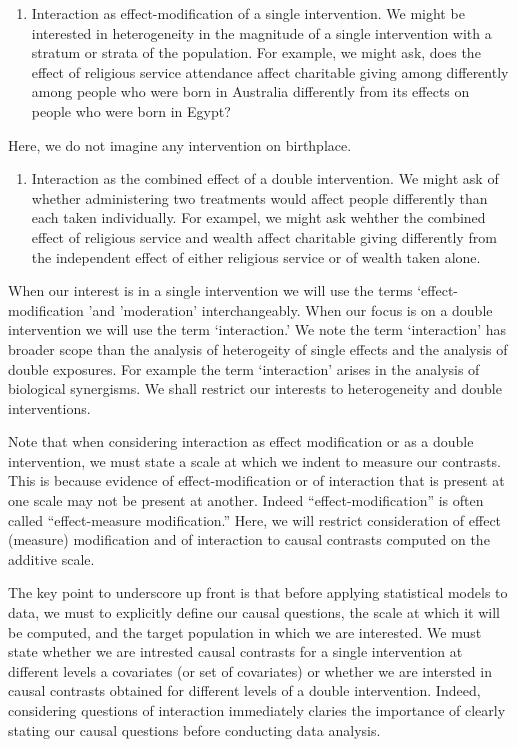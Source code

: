 \documentclass[
  single column]{article}
\providecommand{\tightlist}{%
  \setlength{\itemsep}{0pt}\setlength{\parskip}{0pt}}\usepackage{longtable,booktabs,array}
\begin{document}
\begin{enumerate}
\def\labelenumi{(\arabic{enumi})}
\tightlist
\item
  Interaction as effect-modification of a single intervention. We might
  be interested in heterogeneity in the magnitude of a single
  intervention with a stratum or strata of the population. For example,
  we might ask, does the effect of religious service attendance affect
  charitable giving among differently among people who were born in
  Australia differently from its effects on people who were born in
  Egypt?
\end{enumerate}

Here, we do not imagine any intervention on birthplace.

\begin{enumerate}
\def\labelenumi{(\arabic{enumi})}
\setcounter{enumi}{1}
\tightlist
\item
  Interaction as the combined effect of a double intervention. We might
  ask of whether administering two treatments would affect people
  differently than each taken individually. For exampel, we might ask
  wehther the combined effect of religious service and wealth affect
  charitable giving differently from the independent effect of either
  religious service or of wealth taken alone.
\end{enumerate}

When our interest is in a single intervention we will use the terms
`effect-modification 'and 'moderation' interchangeably. When our focus
is on a double intervention we will use the term `interaction.' We note
the term `interaction' has broader scope than the analysis of
heterogeity of single effects and the analysis of double exposures. For
example the term `interaction' arises in the analysis of biological
synergisms. We shall restrict our interests to heterogeneity and double
interventions.

Note that when considering interaction as effect modification or as a
double intervention, we must state a scale at which we indent to measure
our contrasts. This is because evidence of effect-modification or of
interaction that is present at one scale may not be present at another.
Indeed ``effect-modification'' is often called ``effect-measure
modification.'' Here, we will restrict consideration of effect (measure)
modification and of interaction to causal contrasts computed on the
additive scale.

The key point to underscore up front is that before applying statistical
models to data, we must to explicitly define our causal questions, the
scale at which it will be computed, and the target population in which
we are interested. We must state whether we are intrested causal
contrasts for a single intervention at different levels a covariates (or
set of covariates) or whether we are intersted in causal contrasts
obtained for different levels of a double intervention. Indeed,
considering questions of interaction immediately claries the importance
of clearly stating our causal questions before conducting data analysis.
\end{document}
